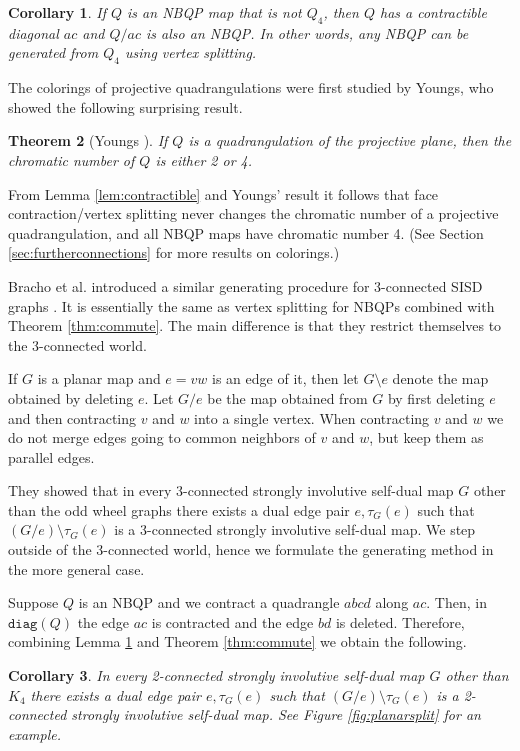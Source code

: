 \documentclass{article}
\newtheorem{theorem}{Theorem}[section]
\newtheorem{corollary}[theorem]{Corollary}
\newcounter{example}
\newcommand{\diag}[0]{\mathtt{diag}}
\begin{document}
\begin{corollary} \label{cor:contractible2}
    If $Q$ is an NBQP map that is not $Q_4$, then $Q$ has a contractible diagonal $ac$ and $Q/ac$ is also an NBQP. In other words, any NBQP can be generated from $Q_4$ using vertex splitting.
\end{corollary}

 The colorings of projective quadrangulations were first studied by Youngs, who showed the following surprising result. 

\begin{theorem}[Youngs \cite{YOU96}]\label{thm:youngs}
    If $Q$ is a quadrangulation of the projective plane, then the chromatic number of $Q$ is either 2 or 4.
\end{theorem}

From Lemma \ref{lem:contractible} and Youngs' result it follows that face contraction/vertex splitting never changes the chromatic number of a projective quadrangulation, and all NBQP maps have chromatic number 4. (See Section \ref{sec:furtherconnections} for more results on colorings.)


Bracho et al. introduced a similar generating procedure for 3-connected SISD graphs \cite{bracho2020strongly}. It is essentially the same as vertex splitting for NBQPs combined with Theorem \ref{thm:commute}. The main difference is that they restrict themselves to the 3-connected world. 

If $G$ is a planar map and $e=vw$ is an edge of it, then let $G\setminus e$ denote the map obtained by deleting $e$. Let $G/e$ be the map obtained from $G$ by first deleting $e$ and then contracting $v$ and $w$ into a single vertex. When contracting $v$ and $w$ we do not merge edges going to common neighbors of $v$ and $w$, but keep them as parallel edges.  

They showed that in every 3-connected strongly involutive self-dual map $G$ other than the odd wheel graphs there exists a dual edge pair $e,\tau_G(e)$ such that $(G/ e)\setminus \tau_G(e)$ is a 3-connected strongly involutive self-dual map. We step outside of the 3-connected world, hence we formulate the generating method in the more general case.


Suppose $Q$ is an NBQP and we contract a quadrangle $abcd$ along $ac$. Then, in $\diag(Q)$ the edge $ac$ is contracted and the edge $bd$ is deleted. Therefore, combining Lemma \ref{cor:contractible2} and Theorem \ref{thm:commute} we obtain the following.

\begin{corollary}\label{cor:generatingsisdgraphs}
     In every 2-connected strongly involutive self-dual map $G$ other than $K_4$ there exists a dual edge pair $e,\tau_G(e)$ such that $(G/ e)\setminus \tau_G(e)$ is a 2-connected strongly involutive self-dual map. See Figure \ref{fig:planarsplit} for an example. 
\end{corollary}
\end{document}
